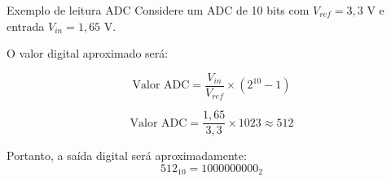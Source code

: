 \begin{frame}{Exemplo de leitura ADC}
    Considere um ADC de 10 bits com $V_{ref} = 3{,}3\text{ V}$
    e entrada $V_{in} = 1{,}65\text{ V}$.

    O valor digital aproximado será:

    \[
        \text{Valor ADC} =
        \frac{V_{in}}{V_{ref}} \times (2^{10}-1)
    \]

    \[
        \text{Valor ADC} =
        \frac{1{,}65}{3{,}3} \times 1023
        \approx 512
    \]

    Portanto, a saída digital será aproximadamente:
    \[
        512_{10} = 1000000000_2
    \]
\end{frame}